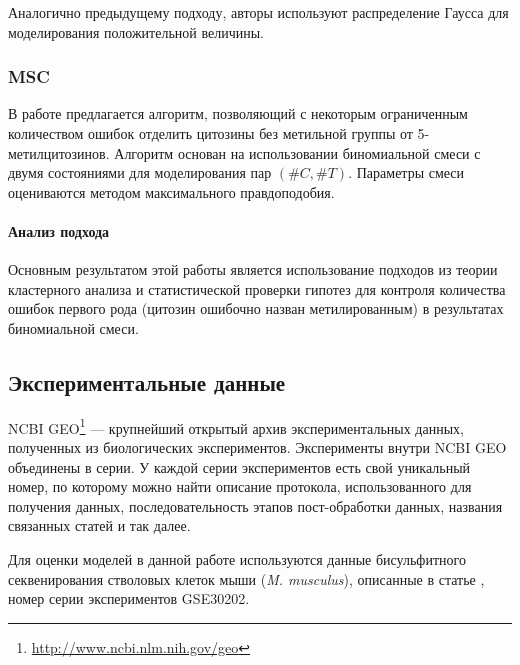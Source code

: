 Аналогично предыдущему подходу, авторы используют распределение Гаусса для моделирования
положительной величины.

\subsubsection{MSC}
\label{subsub:msc}

В работе \cite{Cheng2014} предлагается алгоритм, позволяющий с некоторым ограниченным количеством
ошибок отделить цитозины без метильной группы от 5-метилцитозинов. Алгоритм основан на использовании
биномиальной смеси с двумя состояниями для моделирования пар $(\#C, \#T)$. Параметры смеси
оцениваются методом максимального правдоподобия.

\paragraph{Анализ подхода}

Основным результатом этой работы является использование подходов из теории кластерного
анализа и статистической проверки гипотез для контроля количества ошибок первого рода
(цитозин ошибочно назван метилированным) в результатах биномиальной смеси.

\subsection{Экспериментальные данные}
\label{sub:data}

NCBI GEO\footnote{\url{http://www.ncbi.nlm.nih.gov/geo}} --- крупнейший открытый архив экспериментальных
данных, полученных из биологических экспериментов. Эксперименты внутри NCBI GEO объединены в серии. У
каждой серии экспериментов есть свой уникальный номер, по которому можно найти описание протокола,
использованного для получения данных, последовательность этапов пост-обработки данных,
названия связанных статей и так далее.

Для оценки моделей в данной работе используются данные бисульфитного секвенирования стволовых клеток
мыши (\emph{M. musculus}), описанные в статье \cite{Stadler2011}, номер серии экспериментов GSE30202.
